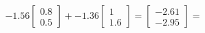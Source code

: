 \documentclass[preview]{standalone}
\begin{document}
\begin{align*}
-1.56 \begin{bmatrix} 0.8 \\ 0.5 \end{bmatrix} + -1.36 \begin{bmatrix} 1 \\ 1.6 \end{bmatrix} = \begin{bmatrix} -2.61 \\ -2.95 \end{bmatrix} =
\end{align*}
\end{document}

